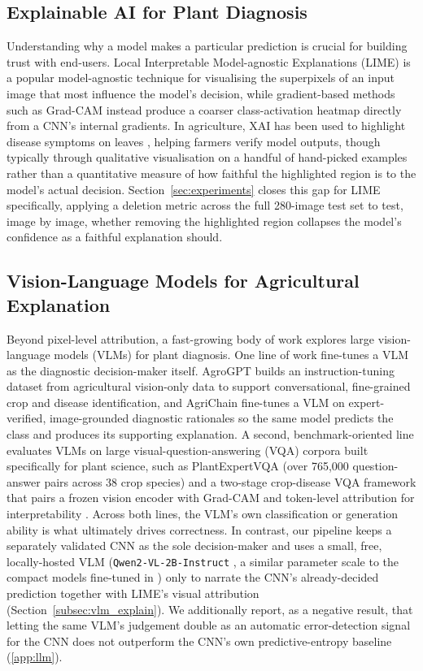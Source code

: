 \subsection{Explainable AI for Plant Diagnosis}
Understanding why a model makes a particular prediction is crucial for building trust with end‑users. Local Interpretable Model-agnostic Explanations (LIME) \citep{ribeiro2016why} is a popular model-agnostic technique for visualising the superpixels of an input image that most influence the model's decision, while gradient-based methods such as Grad-CAM \citep{selvaraju2017grad} instead produce a coarser class-activation heatmap directly from a CNN's internal gradients. In agriculture, XAI has been used to highlight disease symptoms on leaves \citep{sharma2020explainable}, helping farmers verify model outputs, though typically through qualitative visualisation on a handful of hand-picked examples rather than a quantitative measure of how faithful the highlighted region is to the model's actual decision. Section~\ref{sec:experiments} closes this gap for LIME specifically, applying a deletion metric across the full 280-image test set to test, image by image, whether removing the highlighted region collapses the model's confidence as a faithful explanation should.

\subsection{Vision-Language Models for Agricultural Explanation}
Beyond pixel-level attribution, a fast-growing body of work explores large vision-language models (VLMs) for plant diagnosis. One line of work fine-tunes a VLM as the diagnostic decision-maker itself. AgroGPT \citep{awais2025agrogpt} builds an instruction-tuning dataset from agricultural vision-only data to support conversational, fine-grained crop and disease identification, and AgriChain \citep{mahmood2026agrichain} fine-tunes a VLM on expert-verified, image-grounded diagnostic rationales so the same model predicts the class and produces its supporting explanation. A second, benchmark-oriented line evaluates VLMs on large visual-question-answering (VQA) corpora built specifically for plant science, such as PlantExpertVQA \citep{sakib2025plantexpertvqa} (over 765,000 question-answer pairs across 38 crop species) and a two-stage crop-disease VQA framework that pairs a frozen vision encoder with Grad-CAM and token-level attribution for interpretability \citep{hossain2026cropvqa}. Across both lines, the VLM's own classification or generation ability is what ultimately drives correctness. In contrast, our pipeline keeps a separately validated CNN as the sole decision-maker and uses a small, free, locally-hosted VLM (\texttt{Qwen2-VL-2B-Instruct} \citep{wang2024qwen2vl}, a similar parameter scale to the compact models fine-tuned in \citet{sakib2025plantexpertvqa}) only to narrate the CNN's already-decided prediction together with LIME's visual attribution (Section~\ref{subsec:vlm_explain}). We additionally report, as a negative result, that letting the same VLM's judgement double as an automatic error-detection signal for the CNN does not outperform the CNN's own predictive-entropy baseline (\ref{app:llm}).

